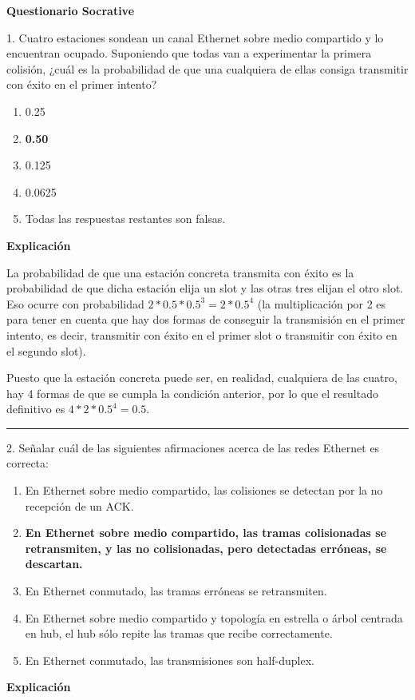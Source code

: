 \documentclass[10pt,a4paper]{article}
\begin{document}
\begin{center}
  \bfseries\Huge Questionario Socrative
\end{center}
\vspace{20pt}

1. Cuatro estaciones sondean un canal Ethernet sobre medio compartido y lo encuentran ocupado.
Suponiendo que todas van a experimentar la primera colisión, ¿cuál es la probabilidad de que una cualquiera de
ellas consiga transmitir con éxito en el primer intento?

\begin{enumerate}[label=\alph*]
    \item 0.25
    \item \textbf{0.50}
    \item 0.125
    \item 0.0625
    \item Todas las respuestas restantes son falsas.
\end{enumerate}

\textbf{Explicación}

La probabilidad de que una estación concreta transmita con éxito es la probabilidad de que dicha estación
elija un slot y las otras tres elijan el otro slot. Eso ocurre con probabilidad $2*0.5*0.5^3 = 2*0.5^4$
(la multiplicación por 2 es para tener en cuenta que hay dos formas de conseguir la transmisión en el primer
intento, es decir, transmitir con éxito en el primer slot o transmitir con éxito en el segundo slot).

Puesto que la estación concreta puede ser, en realidad, cualquiera de las cuatro, hay 4 formas de que se cumpla
la condición anterior, por lo que el resultado definitivo es $4*2*0.5^4 = 0.5$.

\vspace{15pt} \hrule \vspace{15pt}




2. Señalar cuál de las siguientes afirmaciones acerca de las redes Ethernet es correcta:

\begin{enumerate}[label=\alph*]
    \item En Ethernet sobre medio compartido, las colisiones se detectan por la no recepción de un ACK.
    \item \textbf{En Ethernet sobre medio compartido, las tramas colisionadas se retransmiten, y las no colisionadas, pero detectadas erróneas, se descartan.}
    \item En Ethernet conmutado, las tramas erróneas se retransmiten.
    \item En Ethernet sobre medio compartido y topología en estrella o árbol centrada en hub, el hub sólo repite las tramas que recibe correctamente.
    \item En Ethernet conmutado, las transmisiones son half-duplex.
\end{enumerate}
\textbf{Explicación}
\end{document}
